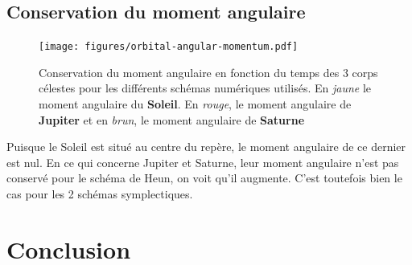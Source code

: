 \documentclass[11pt,twoside=semi,openright,numbers=noenddot]{article}
\begin{document}
\subsection{Conservation du moment angulaire}

\begin{figure}[H]
    \centering
    \texttt{[image: figures/orbital-angular-momentum.pdf]}
    \caption{Conservation du moment angulaire en fonction du temps des 3 corps célestes pour les différents schémas numériques utilisés. En \emph{jaune} le moment angulaire du \textbf{Soleil}. En \emph{rouge}, le moment angulaire de \textbf{Jupiter} et en \emph{brun}, le moment angulaire de \textbf{Saturne}}
    \label{fig:orbital-angular-momentum}
\end{figure}

Puisque le Soleil est situé au centre du repère, le moment angulaire de ce dernier est nul. En ce qui concerne Jupiter et Saturne, leur moment angulaire n'est pas conservé pour le schéma de Heun, on voit qu'il augmente. C'est toutefois bien le cas pour les 2 schémas symplectiques.


\section{Conclusion}

\newpage
\end{document}
